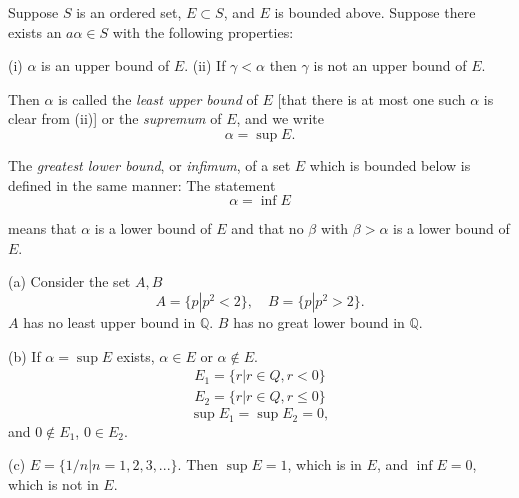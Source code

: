 \begin{myDefinition}\label{myDefinition:1.8}
Suppose $S$ is an ordered set, $E \subset S$, and $E$ is bounded above.
Suppose there exists an $a\alpha \in S$ with the following properties:

(i) $\alpha$ is an upper bound of $E$.
(ii) If $\gamma <\alpha$ then $\gamma$ is not an upper bound of $E$.

Then $\alpha$ is called the \emph{least upper bound} of $E$ [that there is at most one such
$\alpha$ is clear from (ii)] or the \emph{supremum} of $E$, and we write
\begin{equation*}
    \alpha = \sup E.
\end{equation*}

The \emph{greatest lower bound}, or \emph{infimum}, of a set $E$ which is bounded below
is defined in the same manner: The statement
\begin{equation*}
    \alpha = \inf E
\end{equation*}

means that $\alpha$ is a lower bound of $E$ and that no $\beta$ with $\beta > \alpha$ is a lower bound
of $E$.
\end{myDefinition}



\begin{myExample}\label{Example:1.9}
(a) Consider the set $A, B$
    \begin{equation*}
        A = \{p|p^2 < 2\},\quad
        B = \{p|p^2 > 2\}.
    \end{equation*}
    $A$ has no least upper bound in $\mathbb{Q}$.
    $B$ has no great lower bound in $\mathbb{Q}$.
    
    (b) If $\alpha = \sup E$ exists, $\alpha\in E$ or $\alpha \notin E$.
    \begin{align*}
        E_1 = \{r |r\in Q, r < 0\}\\
        E_2 = \{r |r\in Q, r \leq 0\}
    \end{align*}
    \begin{equation*}
        \sup E_1 = \sup E_2 = 0,
    \end{equation*}
    and $0\not\in E_1$, $0\in E_2$.
    
    (c) $E = \{1/n | n = 1,2,3,...\}$. Then $\sup E = 1$, which is in $E$, and $\inf E = 0$, which is not in $E$.
\end{myExample}


